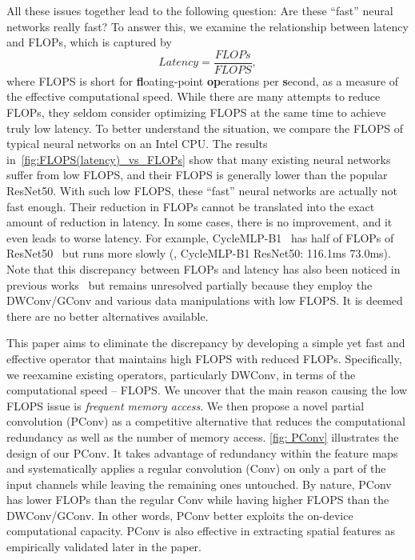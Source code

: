 All these issues together lead to the following question: Are
these ``fast'' neural networks really fast? To answer this, we examine the relationship between latency and FLOPs, which is captured by 
\begin{equation}
  Latency = \frac{FLOPs}{FLOPS},
  \label{eq:latency_FLOPs}
\end{equation}
where FLOPS is short for {\bf fl}oating-point {\bf op}erations per {\bf s}econd, as a measure of the effective computational speed. While there are many attempts to reduce FLOPs, they seldom consider optimizing FLOPS at the same time to achieve truly low latency. To better understand the situation, we compare the FLOPS of typical neural networks on an Intel CPU. The results in~\cref{fig:FLOPS(latency)_vs_FLOPs} show that many existing neural networks suffer from low FLOPS, and their FLOPS is generally lower than the popular ResNet50. With such low FLOPS, these ``fast'' neural networks are actually not fast enough.
Their reduction in FLOPs cannot be translated into the exact amount of reduction in latency. In some cases, there is no improvement, and it even leads to worse latency. For example, CycleMLP-B1~\cite{chen2021cyclemlp} has half of FLOPs of ResNet50~\cite{he2016deep} but runs more slowly (\ie, CycleMLP-B1 \vs ResNet50: 116.1ms \vs 73.0ms). Note that this discrepancy between FLOPs and latency has also been noticed in previous works~\cite{ma2018shufflenet,mehta2021mobilevit} but remains unresolved partially because they employ the DWConv/GConv and various data manipulations with low FLOPS. It is deemed there are no better alternatives available.

This paper aims to eliminate the discrepancy by developing a simple yet fast and effective operator that maintains high FLOPS with reduced FLOPs. Specifically, we reexamine existing operators, particularly  DWConv, in terms of the computational speed -- FLOPS. We uncover that the main reason causing the low FLOPS issue is \emph{frequent memory access}. We then propose a novel partial convolution (PConv) as a competitive alternative that reduces the computational redundancy as well as the number of memory access. \cref{fig: PConv} illustrates the design of our PConv. It takes advantage of redundancy within the feature maps and systematically applies a regular convolution (Conv) on only a part of the input channels while leaving the remaining ones untouched. By nature, PConv has lower FLOPs than the regular Conv while having higher FLOPS than the DWConv/GConv. In other words, PConv better exploits the on-device computational capacity. PConv is also effective in extracting spatial features as empirically validated later in the paper. 


